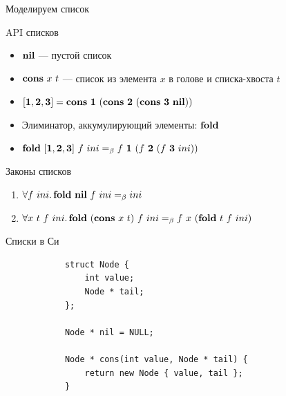     \begin{frame}[fragile]{Моделируем список}
        \pause
        \begin{block}{API списков}
            \begin{itemize}
                \item $\mathbf{nil}$ --- пустой список
                \item $\mathbf{cons} ~ x ~ t$ --- список из элемента $x$ в голове и списка-хвоста $t$
                \item[\eg] $\mathbf{[}\mathbf{1}, \mathbf{2}, \mathbf{3}\mathbf{]} = \mathbf{cons} ~ \mathbf{1} ~ (\mathbf{cons} ~ \mathbf{2} ~ (\mathbf{cons} ~ \mathbf{3} ~ \mathbf{nil}))$
                \item Элиминатор, аккумулирующий элементы: $\mathbf{fold}$
                \item[\eg] $\mathbf{fold} ~ \mathbf{[}\mathbf{1}, \mathbf{2}, \mathbf{3}\mathbf{]} ~ f ~ ini =_\beta f ~ \mathbf{1} ~ (f ~ \mathbf{2} ~ (f ~ \mathbf{3} ~ ini))$
            \end{itemize}
        \end{block}
        \pause
        \begin{block}{Законы списков}
            \begin{enumerate}
                \item $\forall f~ini\ldotp \mathbf{fold} ~ \mathbf{nil} ~ f ~ ini =_\beta ini$
                \item $\forall x~t~f~ini\ldotp \mathbf{fold} ~ (\mathbf{cons} ~ x ~ t) ~ f ~ ini =_\beta f ~ x ~ (\mathbf{fold} ~ t ~ f ~ ini)$
            \end{enumerate}
        \end{block}
    \end{frame}

    \begin{frame}[fragile]{Списки в Си \popslide}
        \begin{verbatim}
            struct Node {
                int value;
                Node * tail;
            };

            Node * nil = NULL;

            Node * cons(int value, Node * tail) {
                return new Node { value, tail };
            }
        \end{verbatim}
    \end{frame}

